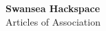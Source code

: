 

\begin{titlepage}
\begin{center}
{\bf \LARGE Swansea Hackspace}\\[36pt]
{\Large Articles of Association}

\vfill

\end{center}
\end{titlepage}


